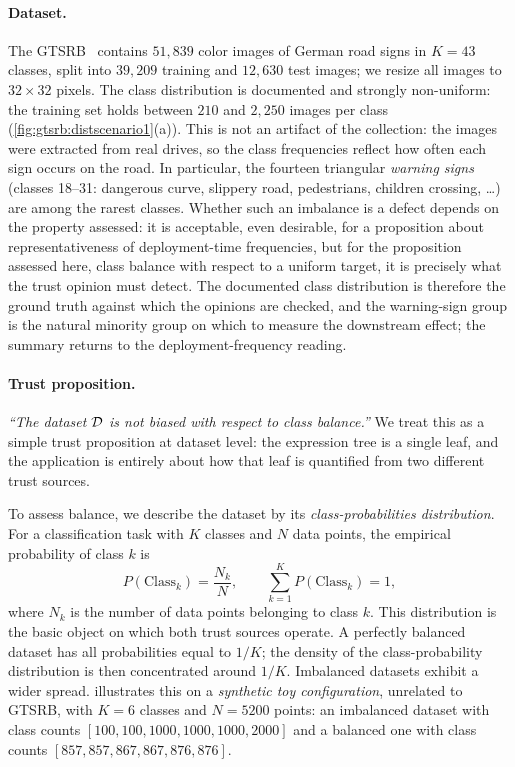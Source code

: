 \paragraph{Dataset.}
The \acf{GTSRB}~\cite{stallkamp2012man,GTSRB} contains $51{,}839$ color images of German road signs in $K = 43$ classes, split into $39{,}209$ training and $12{,}630$ test images; we resize all images to $32 \times 32$ pixels. The class distribution is documented and strongly non-uniform: the training set holds between $210$ and $2{,}250$ images per class (\cref{fig:gtsrb:distscenario1}(a)). This is not an artifact of the collection: the images were extracted from real drives, so the class frequencies reflect how often each sign occurs on the road. In particular, the fourteen triangular \emph{warning signs} (classes 18--31: dangerous curve, slippery road, pedestrians, children crossing, \dots) are among the rarest classes. Whether such an imbalance is a defect depends on the property assessed: it is acceptable, even desirable, for a proposition about representativeness of deployment-time frequencies, but for the proposition assessed here, class balance with respect to a uniform target, it is precisely what the trust opinion must detect. The documented class distribution is therefore the ground truth against which the opinions are checked, and the warning-sign group is the natural minority group on which to measure the downstream effect; the summary returns to the deployment-frequency reading.

\paragraph{Trust proposition.}
\emph{``The dataset $\mathcal{D}$ is not biased with respect to class balance.''} We treat this as a simple trust proposition at dataset level: the expression tree is a single leaf, and the application is entirely about how that leaf is quantified from two different trust sources.

To assess balance, we describe the dataset by its \emph{class-probabilities distribution}. For a classification task with $K$ classes and $N$ data points, the empirical probability of class $k$ is
\begin{equation}
P(\mathrm{Class}_k) = \frac{N_k}{N}, \qquad
\sum_{k=1}^{K} P(\mathrm{Class}_k) = 1,
\end{equation}
where $N_k$ is the number of data points belonging to class $k$. This distribution is the basic object on which both trust sources operate. A perfectly balanced dataset has all probabilities equal to $1/K$; the density of the class-probability distribution is then concentrated around $1/K$. Imbalanced datasets exhibit a wider spread.  illustrates this on a \emph{synthetic toy configuration}, unrelated to \ac{GTSRB}, with $K = 6$ classes and $N = 5200$ points: an imbalanced dataset with class counts $[100,\allowbreak 100,\allowbreak 1000,\allowbreak 1000,\allowbreak 1000,\allowbreak 2000]$ and a balanced one with class counts $[857,\allowbreak 857,\allowbreak 867,\allowbreak 867,\allowbreak 876,\allowbreak 876]$.

